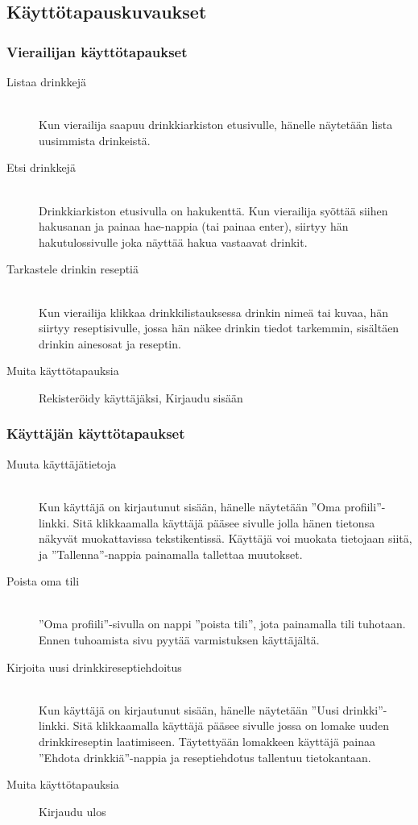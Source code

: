 \documentclass[a4paper]{article}
\begin{document}
\subsection{Käyttötapauskuvaukset}
\subsubsection{Vierailijan käyttötapaukset}
\begin{description}
  \item[Listaa drinkkejä] \hfill \\ Kun vierailija saapuu drinkkiarkiston etusivulle, hänelle näytetään lista uusimmista drinkeistä.
  \item[Etsi drinkkejä] \hfill \\ Drinkkiarkiston etusivulla on hakukenttä. Kun vierailija syöttää siihen hakusanan ja painaa hae-nappia (tai painaa enter), siirtyy hän hakutulossivulle joka näyttää hakua vastaavat drinkit.
  \item[Tarkastele drinkin reseptiä] \hfill \\ Kun vierailija klikkaa drinkkilistauksessa drinkin nimeä tai kuvaa, hän siirtyy reseptisivulle, jossa hän näkee drinkin tiedot tarkemmin, sisältäen drinkin ainesosat ja reseptin.
  \item[Muita käyttötapauksia] Rekisteröidy käyttäjäksi, Kirjaudu sisään
\end{description}

\subsubsection{Käyttäjän käyttötapaukset}
\begin{description}
  \item[Muuta käyttäjätietoja] \hfill \\ Kun käyttäjä on kirjautunut sisään, hänelle näytetään ''Oma profiili''-linkki. Sitä klikkaamalla käyttäjä pääsee sivulle jolla hänen tietonsa näkyvät muokattavissa tekstikentissä. Käyttäjä voi muokata tietojaan siitä, ja ''Tallenna''-nappia painamalla tallettaa muutokset.
  \item[Poista oma tili] \hfill \\ ''Oma profiili''-sivulla on nappi ''poista tili'', jota painamalla tili tuhotaan. Ennen tuhoamista sivu pyytää varmistuksen käyttäjältä.
  \item[Kirjoita uusi drinkkireseptiehdoitus] \hfill \\ Kun käyttäjä on kirjautunut sisään, hänelle näytetään ''Uusi drinkki''-linkki. Sitä klikkaamalla käyttäjä pääsee sivulle jossa on lomake uuden drinkkireseptin laatimiseen. Täytettyään lomakkeen käyttäjä painaa ''Ehdota drinkkiä''-nappia ja reseptiehdotus tallentuu tietokantaan.
  \item[Muita käyttötapauksia] Kirjaudu ulos
\end{description}
\end{document}
